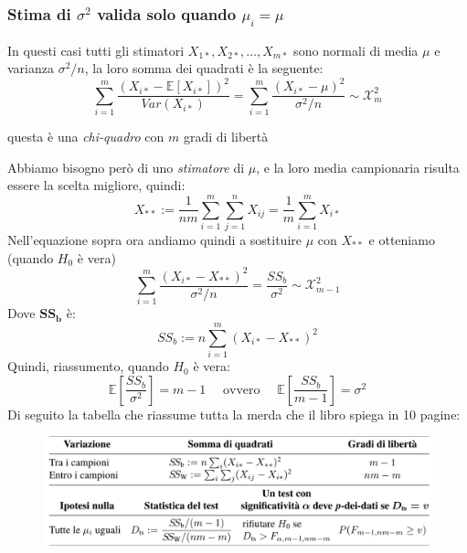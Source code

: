 \documentclass[]{article}
\newcommand{\ev}{\mathbb{E}[X]}
\renewcommand{\ev}[1]{\mathbb{E}\left[#1\right]}
\begin{document}
    \subsubsection{Stima di $\sigma^2$ valida solo quando $\mu_i = \mu$}
    In questi casi tutti gli stimatori $X_{1*}, X_{2*}, \ldots, X_{m*}$ sono normali di media $\mu$ e varianza $\sigma^2/n$, la loro somma dei quadrati è la seguente:
    \[ \sum_{i=1}^{m} \frac{(X_{i*} - \ev{X_{i*}})^2}{Var(X_{i*})} = \sum_{i=1}^{m} \frac{(X_{i*} - \mu)^2}{\sigma^2 / n} \sim \mathcal{X}^2_m \]
    \centerline{questa è una \textit{chi-quadro} con $m$ gradi di libertà}
    Abbiamo bisogno però di uno \textit{stimatore} di $\mu$, e la loro media campionaria risulta essere la scelta migliore, quindi:
    \[ X_{**} := \frac{1}{nm} \sum_{i=1}^{m} \sum_{j=1}^{n} X_{ij} = \frac{1}{m} \sum_{i=1}^{m} X_{i*} \]
    Nell'equazione sopra ora andiamo quindi a sostituire $\mu$ con $X_{**}$ e otteniamo (quando $H_0$ è vera) 
    \[ \sum_{i=1}^{m} \frac{(X_{i*} - X_{**})^2}{\sigma^2 / n} = \frac{SS_b}{\sigma^2} \sim \mathcal{X}^2_{m-1} \]
    Dove $\boldsymbol{SS_b}$ è:
    \[ SS_b := n \sum_{i=1}^{m} (X_{i*} - X_{**})^2 \]
    Quindi, riassumento, quando $H_0$ è vera:
    \[ \ev{\frac{SS_b}{\sigma^2}} = m -1 \quad \text{ ovvero } \quad \ev{\frac{SS_b}{m-1}} = \sigma^2 \]
    Di seguito la tabella che riassume tutta la merda che il libro spiega in 10 pagine:
    \begin{figure}[H]
        \includegraphics[width=\textwidth]{images/boh_11.png}
    \end{figure}
\end{document}
